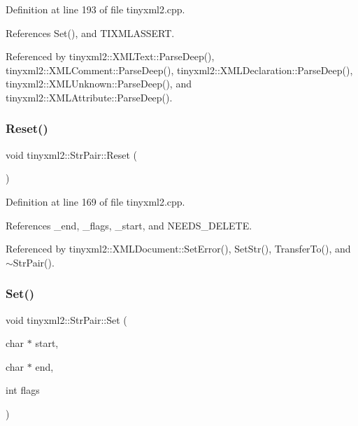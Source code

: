 Definition at line 193 of file tinyxml2.\+cpp.



References Set(), and T\+I\+X\+M\+L\+A\+S\+S\+E\+RT.



Referenced by tinyxml2\+::\+X\+M\+L\+Text\+::\+Parse\+Deep(), tinyxml2\+::\+X\+M\+L\+Comment\+::\+Parse\+Deep(), tinyxml2\+::\+X\+M\+L\+Declaration\+::\+Parse\+Deep(), tinyxml2\+::\+X\+M\+L\+Unknown\+::\+Parse\+Deep(), and tinyxml2\+::\+X\+M\+L\+Attribute\+::\+Parse\+Deep().

\mbox{\label{classtinyxml2_1_1_str_pair_a80c1b3bd99bf62ae85c94a29ce537125}} 
\subsubsection{Reset()}
{\footnotesize\ttfamily void tinyxml2\+::\+Str\+Pair\+::\+Reset (\begin{DoxyParamCaption}{ }\end{DoxyParamCaption})}



Definition at line 169 of file tinyxml2.\+cpp.



References \+\_\+end, \+\_\+flags, \+\_\+start, and N\+E\+E\+D\+S\+\_\+\+D\+E\+L\+E\+TE.



Referenced by tinyxml2\+::\+X\+M\+L\+Document\+::\+Set\+Error(), Set\+Str(), Transfer\+To(), and $\sim$\+Str\+Pair().

\mbox{\label{classtinyxml2_1_1_str_pair_a4f05549373394266a1eecba26813c166}} 
\subsubsection{Set()}
{\footnotesize\ttfamily void tinyxml2\+::\+Str\+Pair\+::\+Set (\begin{DoxyParamCaption}\item[{char $\ast$}]{start,  }\item[{char $\ast$}]{end,  }\item[{int}]{flags }\end{DoxyParamCaption})\hspace{0.3cm}{\ttfamily [inline]}}




